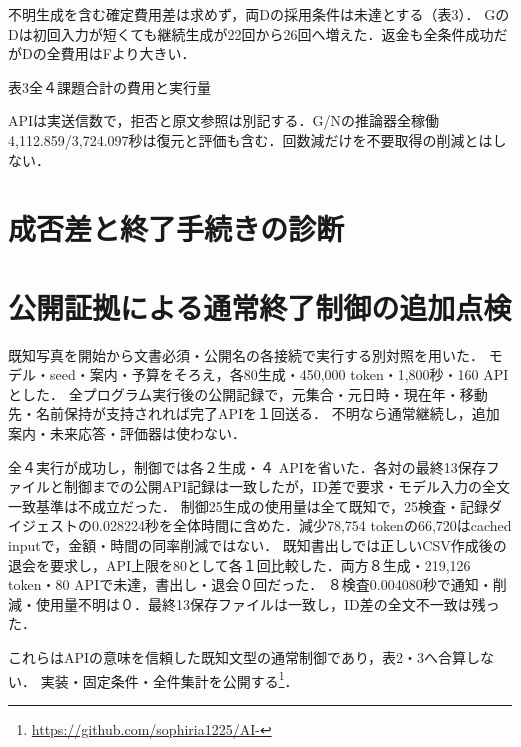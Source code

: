 \documentclass[uplatex,a4paper,twocolumn,10pt]{jsarticle}
\begin{document}
不明生成を含む確定費用差は求めず，両Dの採用条件は未達とする（表3）．
GのDは初回入力が短くても継続生成が22回から26回へ増えた．返金も全条件成功だがDの全費用はFより大きい．

\begin{center}\begin{minipage}{\columnwidth}\centering
\small 表3\quad 全４課題合計の費用と実行量\par\smallskip
\PublicDisplayTotals
\end{minipage}\end{center}

APIは実送信数で，拒否と原文参照は別記する．G/Nの推論器全稼働4,112.859/3,724.097秒は復元と評価も含む．回数減だけを不要取得の削減とはしない．

\section{成否差と終了手続きの診断}
\begingroup
\let\JointTableCenter\center
\let\JointTableEndCenter\endcenter
\renewenvironment{center}{\JointTableCenter\begin{minipage}{\columnwidth}\centering}{\end{minipage}\JointTableEndCenter}

\endgroup

\section{公開証拠による通常終了制御の追加点検}
既知写真を開始から文書必須・公開名の各接続で実行する別対照を用いた．
モデル・seed・案内・予算をそろえ，各80生成・450,000 token・1,800秒・160 APIとした．
全プログラム実行後の公開記録で，元集合・元日時・現在年・移動先・名前保持が支持されれば完了APIを１回送る．
不明なら通常継続し，追加案内・未来応答・評価器は使わない．

全４実行が成功し，制御では各２生成・４ APIを省いた．各対の最終13保存ファイルと制御までの公開API記録は一致したが，ID差で要求・モデル入力の全文一致基準は不成立だった．
制御25生成の使用量は全て既知で，25検査・記録ダイジェストの0.028224秒を全体時間に含めた．減少78,754 tokenの66,720はcached inputで，金額・時間の同率削減ではない．
既知書出しでは正しいCSV作成後の退会を要求し，API上限を80として各１回比較した．両方８生成・219,126 token・80 APIで未達，書出し・退会０回だった．
８検査0.004080秒で通知・削減・使用量不明は０．最終13保存ファイルは一致し，ID差の全文不一致は残った．

これらはAPIの意味を信頼した既知文型の通常制御であり，表2・3へ合算しない．
実装・固定条件・全件集計を公開する\footnote{\url{https://github.com/sophiria1225/AI-}}．
\end{document}
